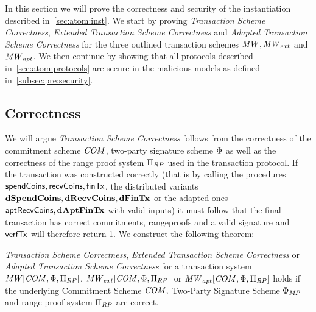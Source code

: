 In this section we will prove the correctness and security of the instantiation described in~\cref{sec:atom:inst}.
We start by proving \emph{Transaction Scheme Correctness}, \emph{Extended Transaction Scheme Correctness} and \emph{Adapted Transaction Scheme Correctness} for the three outlined transaction schemes $\mathit{MW}, \mathit{MW}_{ext}$ and $\mathit{MW}_{apt}$.
We then continue by showing that all protocols described in~\cref{sec:atom:protocols} are secure in the malicious models as defined in~\cref{subsec:pre:security}.

\subsection{Correctness} \label{subsec:atom:correctness}

We will argue \emph{Transaction Scheme Correctness} follows from the correctness of the commitment scheme $\mathit{COM}$, two-party signature scheme $\Phi$ as well as the correctness of the range proof system $\Pi_{RP}$ used in the transaction protocol.
If the transaction was constructed correctly (that is by calling the procedures $\mathsf{spendCoins}, \mathsf{recvCoins}, \mathsf{finTx}$, the distributed variants $\mathbf{dSpendCoins}, \mathbf{dRecvCoins}, \mathbf{dFinTx}$ or the adapted ones $\mathsf{aptRecvCoins}, \mathbf{dAptFinTx}$ with valid inputs) it must follow that the final transaction has correct commitments, rangeproofs and a valid signature and $\mathsf{verfTx}$ will therefore return 1.
We construct the following theorem:

\begin{theorem}
    \label{lem:atom:correctness}
    \emph{Transaction Scheme Correctness}, \emph{Extended Transaction Scheme Correctness} or \emph{Adapted Transaction Scheme Correctness} for a transaction system $\mathit{MW}[\mathit{COM},\Phi,\Pi_{RP}]$, $\mathit{MW}_{ext}[\mathit{COM},\Phi,\Pi_{RP}]$ or $\mathit{MW}_{apt}[\mathit{COM},\Phi,\Pi_{RP}]$ holds if the underlying Commitment Scheme $\mathit{COM},$ Two-Party Signature Scheme $\Phi_{\mathit{MP}}$ and range proof system $\Pi_{RP}$ are correct.
\end{theorem}

